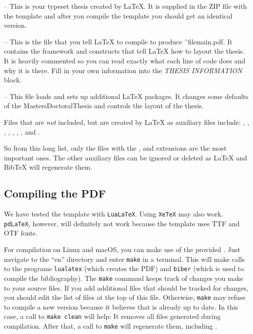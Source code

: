  -- This is your typeset thesis created by LaTeX. It is supplied in the ZIP file with the template and after you compile the template you should get an identical version.

 -- This is the file that you tell LaTeX to compile to produce ˜file{main.pdf}. It contains the framework and constructs that tell LaTeX how to layout the thesis. It is heavily commented so you can read exactly what each line of code does and why it is there. Fill in your own information into the \emph{THESIS INFORMATION} block.

 -- This file loads and sets up additional LaTeX packages. It changes some defaults of the MastersDoctoralThesis and controls the layout of the thesis.

Files that are \emph{not} included, but are created by LaTeX as auxiliary files include: , , , , 
, , , and .

So from this long list, only the files with the ,  and  extensions are the most important ones. The other auxiliary files can be ignored or deleted as LaTeX and BibTeX will regenerate them.


\subsection{Compiling the PDF}

We have tested the template with \texttt{LuaLaTeX}. Using \texttt{XeTeX} may also work. \texttt{pdLaTeX}, however, will definitely not work because the template uses TTF and OTF fonts.

For compilation on Linux and macOS, you can make use of the provided . Just navigate to the ``en'' directory and enter \texttt{make} in a terminal. This will make calls to the programs \texttt{lualatex} (which creates the PDF) and \texttt{biber} (which is used to compile the bibliography). The \texttt{make} command keeps track of changes you make to your source files. If you add additional files that should be tracked for changes, you should edit the list of files at the top of this file. Otherwise, \texttt{make} may refuse to compile a new version because it believes that  is already up to date. In this case, a call to \texttt{make clean} will help: It removes all files generated during compilation. After that, a call to \texttt{make} will regenerate them, including .



